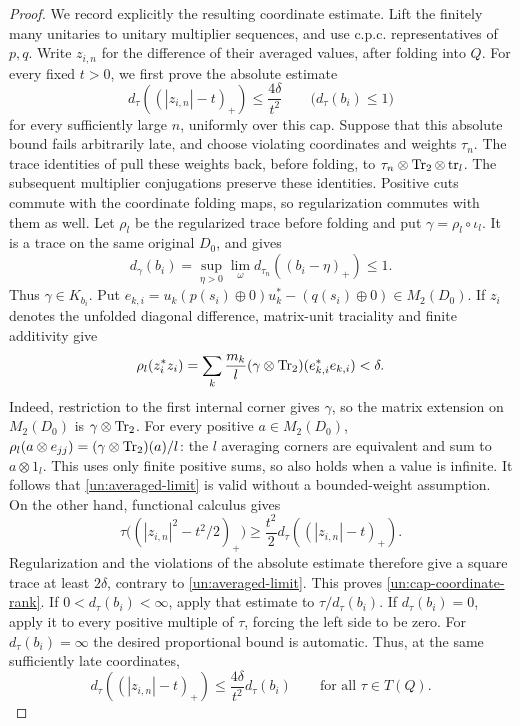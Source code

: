 \begin{proof}
We record explicitly the resulting coordinate estimate.  Lift the
finitely many unitaries to unitary multiplier sequences, and use
c.p.c. representatives of $p,q$.  Write $z_{i,n}$ for the difference
of their averaged values, after folding into $Q$.  For every fixed
$t>0$, we first prove the absolute estimate
\begin{equation}\label{un:cap-coordinate-rank}
 d_\tau((|z_{i,n}|-t)_+)
 \leq \frac{4\delta}{t^2}
 \qquad\bigl(d_\tau(b_i)\leq1\bigr)
\end{equation}
for every sufficiently large $n$, uniformly over this cap.  Suppose
that this absolute bound fails arbitrarily late, and choose
violating coordinates and weights $\tau_n$.  The trace identities
of  pull these weights back, before folding, to
$\tau_n\otimes\operatorname{Tr}_2\otimes\operatorname{tr}_l$.  The subsequent multiplier
conjugations preserve these identities.  Positive cuts commute with
the coordinate folding maps, so regularization commutes with
them as well.  Let $\rho_l$ be the regularized trace before folding
and put $\gamma=\rho_l\circ\iota_l$.  It is a trace on the same
original $D_0$, and  gives
\[
 d_\gamma(b_i)
 =\sup_{\eta>0}\lim_\omega d_{\tau_n}((b_i-\eta)_+)\leq1.
\]
Thus $\gamma\in K_{b_i}$.  Put
$e_{k,i}=u_k(p(s_i)\oplus0)u_k^*-(q(s_i)\oplus0)\in M_2(D_0)$.  If $z_i$ denotes the
unfolded diagonal difference, matrix-unit traciality and finite
additivity give
\begin{equation}\label{un:averaged-limit}
 \rho_l(z_i^*z_i)
 =\sum_k\frac{m_k}{l}(\gamma\otimes\operatorname{Tr}_2)(e_{k,i}^*e_{k,i})<\delta.
\end{equation}
Indeed, restriction to the first internal corner gives $\gamma$,
so the matrix extension on $M_2(D_0)$ is $\gamma\otimes\operatorname{Tr}_2$.
For every positive $a\in M_2(D_0)$,
$\rho_l(a\otimes e_{jj})=(\gamma\otimes\operatorname{Tr}_2)(a)/l$: the $l$
averaging corners are equivalent and sum to $a\otimes1_l$.  This uses only finite positive sums, so also holds
when a value is infinite.  It follows that
\eqref{un:averaged-limit} is valid without a bounded-weight
assumption.  On the other hand, functional calculus gives
\[
 \tau\bigl((|z_{i,n}|^2-t^2/2)_+\bigr)
 \geq \frac{t^2}{2}d_\tau((|z_{i,n}|-t)_+).
\]
Regularization and the violations of the absolute estimate therefore
give a square trace at least $2\delta$, contrary to
\eqref{un:averaged-limit}.  This proves
\eqref{un:cap-coordinate-rank}.  If $0<d_\tau(b_i)<\infty$, apply
that estimate to $\tau/d_\tau(b_i)$.  If $d_\tau(b_i)=0$, apply it
to every positive multiple of $\tau$, forcing the left side to be
zero.  For $d_\tau(b_i)=\infty$ the desired proportional bound is
automatic.  Thus, at the same sufficiently late coordinates,
\begin{equation}\label{un:coordinate-rank}
 d_\tau((|z_{i,n}|-t)_+)
 \leq \frac{4\delta}{t^2}d_\tau(b_i)
 \qquad\text{for all }\tau\in T(Q).
\end{equation}


\end{proof}
